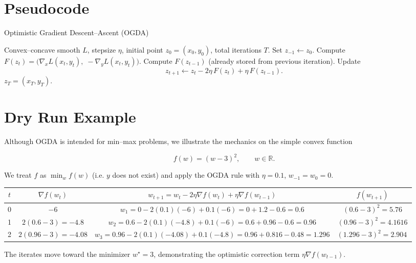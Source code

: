 \documentclass{article}
\newcommand{\R}{\mathbb{R}}
\begin{document}
\section{Pseudocode}
\begin{algorithm}[H]
\caption{Optimistic Gradient Descent–Ascent (OGDA)}\label{alg:ogda}
\begin{algorithmic}[1]
\Require Convex–concave smooth $L$, stepsize $\eta$, initial point $z_0=(x_0,y_0)$, total iterations $T$.
\State Set $z_{-1}\gets z_0$.
    \State Compute $F(z_t)=\bigl(\nabla_x L(x_t,y_t),\;-\nabla_y L(x_t,y_t)\bigr)$.
    \State Compute $F(z_{t-1})$ (already stored from previous iteration).
    \State Update 
    \[
    z_{t+1}\gets z_t-2\eta\,F(z_t)+\eta\,F(z_{t-1}) .
    \]
\EndFor
\State \Return $z_T=(x_T,y_T)$.
\end{algorithmic}
\end{algorithm}

\section{Dry Run Example}
Although OGDA is intended for min–max problems, we illustrate the mechanics on the simple convex function  

\[
f(w)=(w-3)^2,\qquad w\in\R .
\]

We treat $f$ as $\min_w f(w)$ (i.e. $y$ does not exist) and apply the OGDA rule with $\eta=0.1$, $w_{-1}=w_0=0$.

\begin{center}
\begin{tabular}{c|c|c|c}
$t$ & $\nabla f(w_t)$ & $w_{t+1}=w_t-2\eta\nabla f(w_t)+\eta\nabla f(w_{t-1})$ & $f(w_{t+1})$\\\hline
0 & $-6$ & $w_1=0-2(0.1)(-6)+0.1(-6)=0+1.2-0.6=0.6$ & $(0.6-3)^2=5.76$\\
1 & $2(0.6-3)=-4.8$ & $w_2=0.6-2(0.1)(-4.8)+0.1(-6)=0.6+0.96-0.6=0.96$ & $(0.96-3)^2=4.1616$\\
2 & $2(0.96-3)=-4.08$ & $w_3=0.96-2(0.1)(-4.08)+0.1(-4.8)=0.96+0.816-0.48=1.296$ & $(1.296-3)^2=2.904\,$\\
\end{tabular}
\end{center}
The iterates move toward the minimizer $w^\star=3$, demonstrating the optimistic correction term $\eta\nabla f(w_{t-1})$.
\end{document}
